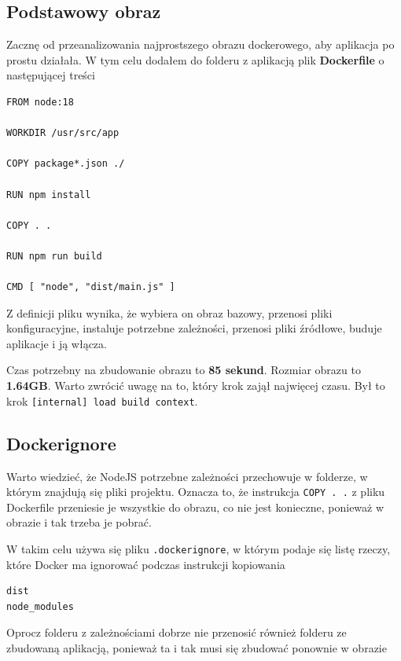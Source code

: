 \documentclass{article}
\begin{document}
\subsection{Podstawowy obraz}

Zacznę od przeanalizowania najprostszego obrazu dockerowego, aby aplikacja po prostu działała. W tym celu dodałem do folderu z aplikacją plik \textbf{Dockerfile} o następującej treści

\begin{lstlisting}[caption=Podstawowy plik Dockerfile]
FROM node:18

WORKDIR /usr/src/app

COPY package*.json ./

RUN npm install

COPY . .

RUN npm run build

CMD [ "node", "dist/main.js" ]
\end{lstlisting}

Z definicji pliku wynika, że wybiera on obraz bazowy, przenosi pliki konfiguracyjne, instaluje potrzebne zależności, przenosi pliki źródłowe, buduje aplikacje i ją włącza.

Czas potrzebny na zbudowanie obrazu to \textbf{85 sekund}. Rozmiar obrazu to \textbf{1.64GB}. Warto zwrócić uwagę na to, który krok zajął najwięcej czasu. Był to krok \lstinline|[internal] load build context|.

\subsection{Dockerignore}

Warto wiedzieć, że NodeJS potrzebne zależności przechowuje w folderze, w którym znajdują się pliki projektu. Oznacza to, że instrukcja \lstinline|COPY . .| z pliku Dockerfile przeniesie je wszystkie do obrazu, co nie jest konieczne, ponieważ w obrazie i tak trzeba je pobrać.

W takim celu używa się pliku \lstinline|.dockerignore|, w którym podaje się listę rzeczy, które Docker ma ignorować podczas instrukcji kopiowania

\begin{lstlisting}[caption=Plik .dockerignore]
dist
node_modules
\end{lstlisting}

Oprocz folderu z zależnościami dobrze nie przenosić również folderu ze zbudowaną aplikacją, ponieważ ta i tak musi się zbudować ponownie w obrazie
\end{document}
